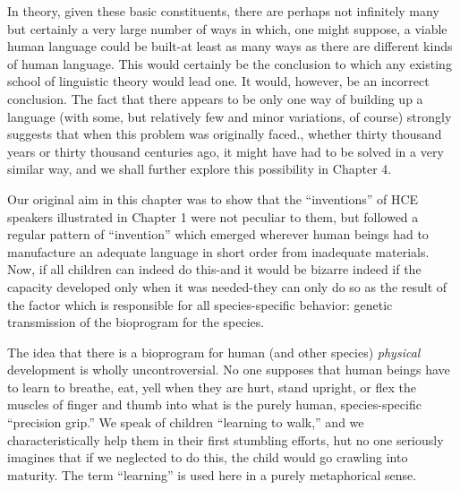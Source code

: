 
In theory, given these basic constituents, there are perhaps not infinitely many but certainly a very large number of ways in which, one might suppose, a viable human language could be built-at least as many ways as there are different kinds of human language. This would certainly be the conclusion to which any existing school of linguistic theory would lead one. It would, however, be an incorrect conclusion. The fact that there appears to be only one way of building up a language (with some, but relatively few and minor variations, of course) strongly suggests that when this problem was originally faced., whether thirty thousand years or thirty thousand centuries ago, it might have had to be solved in a very similar way, and we shall further explore this possibility in Chapter 4.

Our original aim in this chapter was to show that the ``inven\-tions'' of HCE speakers illustrated in Chapter 1 were not peculiar to them, but followed a regular pattern of ``invention'' which emerged wherever human beings had to manufacture an adequate language in short order from inadequate materials. Now, if all children can indeed do this-and it would be bizarre indeed if the capacity developed only when it was needed-they can only do so as the result of the factor which is responsible for all species-specific behavior: genetic trans\-mission of the bioprogram for the species.

The idea that there is a bioprogram for human (and other spe\-cies) \textit{physical} development is wholly uncontroversial. No one supposes that human beings have to learn to breathe, eat, yell when they are hurt, stand upright, or flex the muscles of finger and thumb into what is the purely human, species-specific ``precision grip.'' We speak of children ``learning to walk,'' and we characteristically help them in their first stumbling efforts, hut no one seriously imagines that if we neglected to do this, the child would go crawling into maturity. The term ``learning'' is used here in a purely metaphorical sense.


